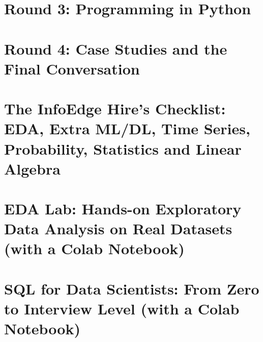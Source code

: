 \documentclass[11pt,openany]{book}
\begin{document}
\part{Round 3: Programming in Python}





\part{Round 4: Case Studies and the Final Conversation}




\part{The InfoEdge Hire's Checklist: EDA, Extra ML/DL, Time Series, Probability, Statistics and Linear Algebra}












\part{EDA Lab: Hands-on Exploratory Data Analysis on Real Datasets (with a Colab Notebook)}





\part{SQL for Data Scientists: From Zero to Interview Level (with a Colab Notebook)}





\backmatter

\end{document}
